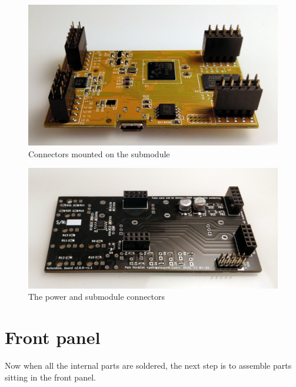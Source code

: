 \documentclass[10pt,a4paper,twocolumn]{article}
\begin{document}
\begin{figure}[h]
  \centering
  \includegraphics[width=\linewidth]{p02.jpg}
  \caption{Connectors mounted on the submodule}
  \label{daisy}
\end{figure}

\begin{figure}[h]
  \centering
  \includegraphics[width=\linewidth]{p03.jpg}
  \caption{The power and submodule connectors}
  \label{connectors}
\end{figure}

\section{Front panel}

Now when all the internal parts are soldered, the next step is to assemble
parts sitting in the front panel.
\end{document}
